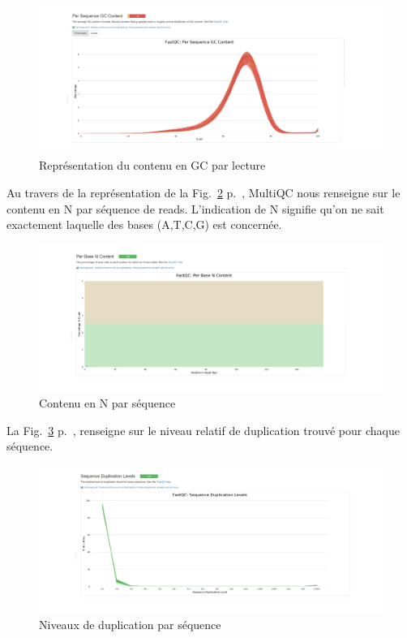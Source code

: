 \documentclass[a4paper,11pt]{article}
\begin{document}
\begin{figure}
  \begin{center}
    \includegraphics[width=16cm]{Images/MultiQC_Plots4}
  \end{center}
  \caption{Représentation du contenu en GC par lecture}
  \label{fig-MultiQC_Plots4}
\end{figure}

Au travers de la représentation de la Fig.~\ref{fig-MultiQC_Plots5}
p.~\pageref{fig-MultiQC_Plots5}, MultiQC nous renseigne sur le contenu
en \og{}N\fg{} par séquence de reads. L'indication de N signifie qu'on
ne sait exactement laquelle des bases (A,T,C,G) est concernée.

\begin{figure}
  \begin{center}
    \includegraphics[width=16cm]{Images/MultiQC_Plots5}
  \end{center}
  \caption{Contenu en \og{}N\fg{} par séquence}
  \label{fig-MultiQC_Plots5}
\end{figure}

La Fig.~\ref{fig-MultiQC_Plots6} p.~\pageref{fig-MultiQC_Plots6}, renseigne sur le
niveau relatif de duplication trouvé pour chaque séquence.

\begin{figure}
  \begin{center}
    \includegraphics[width=16cm]{Images/MultiQC_Plots6}
  \end{center}
  \caption{Niveaux de duplication par séquence}
  \label{fig-MultiQC_Plots6}
\end{figure}
\end{document}
